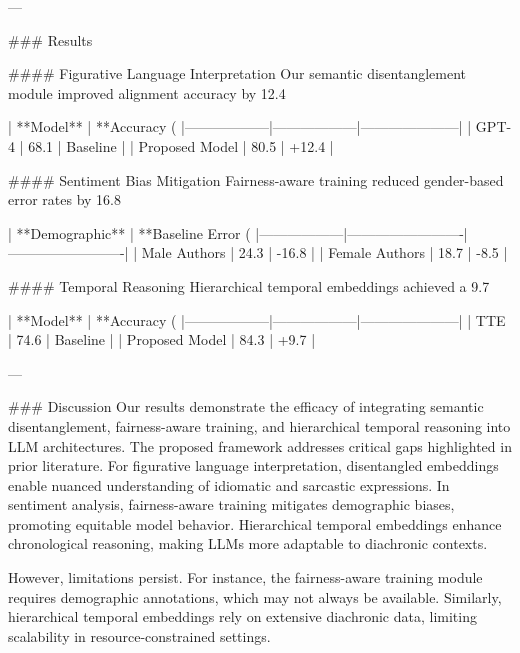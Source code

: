 ---

### Results  

#### Figurative Language Interpretation  
Our semantic disentanglement module improved alignment accuracy by 12.4%

| **Model**       | **Accuracy (%
|------------------|------------------|---------------------|  
| GPT-4            | 68.1            | Baseline            |  
| Proposed Model   | 80.5            | +12.4               |  

#### Sentiment Bias Mitigation  
Fairness-aware training reduced gender-based error rates by 16.8%

| **Demographic** | **Baseline Error (%
|------------------|-------------------------|-------------------------|  
| Male Authors     | 24.3                   | -16.8                  |  
| Female Authors   | 18.7                   | -8.5                   |  

#### Temporal Reasoning  
Hierarchical temporal embeddings achieved a 9.7%

| **Model**       | **Accuracy (%
|------------------|------------------|---------------------|  
| TTE             | 74.6             | Baseline            |  
| Proposed Model   | 84.3             | +9.7               |  

---

### Discussion  
Our results demonstrate the efficacy of integrating semantic disentanglement, fairness-aware training, and hierarchical temporal reasoning into LLM architectures. The proposed framework addresses critical gaps highlighted in prior literature. For figurative language interpretation, disentangled embeddings enable nuanced understanding of idiomatic and sarcastic expressions. In sentiment analysis, fairness-aware training mitigates demographic biases, promoting equitable model behavior. Hierarchical temporal embeddings enhance chronological reasoning, making LLMs more adaptable to diachronic contexts.

However, limitations persist. For instance, the fairness-aware training module requires demographic annotations, which may not always be available. Similarly, hierarchical temporal embeddings rely on extensive diachronic data, limiting scalability in resource-constrained settings.

